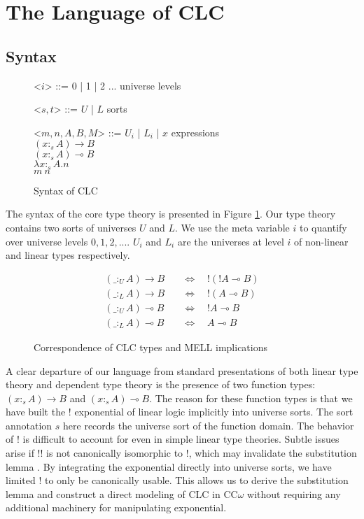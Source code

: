 \documentclass[sigplan,screen,review,anonymous]{acmart}
\newcommand{\indalt}[1][2]{\\\hspace*{-1.2em}\textbar\quad}
\newcommand{\utype}{:_{\scriptscriptstyle U}}
\newcommand{\ltype}{:_{\scriptscriptstyle L}}
\begin{document}
\section{The Language of CLC}
\subsection{Syntax}
\begin{figure}[h]
  \caption{Syntax of CLC}
  \begin{grammar}
    <$i$> ::= 0 | 1 | 2 ... \phantom{* |} \hspace*{3em} universe levels

    <$s, t$> ::= $U$ | $L$ \phantom{| $x$} \hspace*{4.6em} sorts

    <$m, n, A, B, M$> ::= $U_i$ | $L_i$ | $x$ \hspace*{4.2em} expressions
    \indalt $(x :_s A) \rightarrow B$
    \indalt $(x :_s A) \multimap B$
    \indalt $\lambda x :_s A. n$
    \indalt $m\ n$
  \end{grammar}
  \Description{}
  \label{syntax1}
\end{figure}

The syntax of the core type theory is presented in Figure \ref{syntax1}. Our type theory contains two sorts of universes $U$ and $L$. We use the meta variable $i$ to quantify over universe levels $0, 1, 2, ...$. $U_i$ and $L_i$ are the universes at level $i$ of non-linear and linear types respectively.
\begin{figure}[h]
  \caption{Correspondence of CLC types and MELL implications}
  \Description{}
  \begin{align}
    (\_ \utype A) \rightarrow B \quad & \Leftrightarrow \quad !(!A \multimap B) \\
    (\_ \ltype A) \rightarrow B \quad & \Leftrightarrow \quad !(A \multimap B)  \\
    (\_ \utype A) \multimap B \quad   & \Leftrightarrow \quad !A \multimap B    \\
    (\_ \ltype A) \multimap B \quad   & \Leftrightarrow \quad A \multimap B
  \end{align}
  \label{correspondence}
\end{figure}

A clear departure of our language from standard presentations of both linear type theory and dependent type theory is the presence of two function types: $(x :_s A) \rightarrow B$ and $(x :_s A) \multimap B$. The reason for these function types is that we have built the ! exponential of linear logic implicitly into universe sorts. The sort annotation $s$ here records the universe sort of the function domain. The behavior of ! is difficult to account for even in simple linear type theories. Subtle issues arise if !! is not canonically isomorphic to !, which may invalidate the substitution lemma \cite{substitute}. By integrating the exponential directly into universe sorts, we have limited ! to only be canonically usable. This allows us to derive the substitution lemma and construct a direct modeling of CLC in CC$\omega$ without requiring any additional machinery for manipulating exponential.
\end{document}
